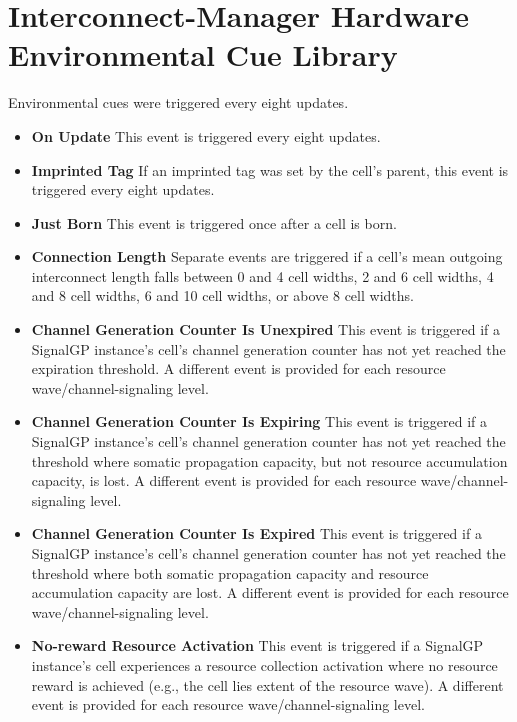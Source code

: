\section{Interconnect-Manager Hardware Environmental Cue Library}

Environmental cues were triggered every eight updates.

\begin{itemize}
\item \textbf{On Update}
This event is triggered every eight updates.
\item \textbf{Imprinted Tag}
If an imprinted tag was set by the cell's parent, this event is triggered every eight updates.
\item \textbf{Just Born}
This event is triggered once after a cell is born.
\item \textbf{Connection Length}
Separate events are triggered if a cell's mean outgoing interconnect length falls between 0 and 4 cell widths, 2 and 6 cell widths, 4 and 8 cell widths, 6 and 10 cell widths, or above 8 cell widths.
\item \textbf{Channel Generation Counter Is Unexpired}
This event is triggered if a SignalGP instance's cell's channel generation counter has not yet reached the expiration threshold.
A different event is provided for each resource wave/channel-signaling level.
\item \textbf{Channel Generation Counter Is Expiring}
This event is triggered if a SignalGP instance's cell's channel generation counter has not yet reached the threshold where somatic propagation capacity, but not resource accumulation capacity, is lost.
A different event is provided for each resource wave/channel-signaling level.
\item \textbf{Channel Generation Counter Is Expired}
This event is triggered if a SignalGP instance's cell's channel generation counter has not yet reached the threshold where both somatic propagation capacity and resource accumulation capacity are lost.
A different event is provided for each resource wave/channel-signaling level.
\item \textbf{No-reward Resource Activation}
This event is triggered if a SignalGP instance's cell experiences a resource collection activation where no resource reward is achieved (e.g., the cell lies extent of the resource wave).
A different event is provided for each resource wave/channel-signaling level.
\end{itemize}

